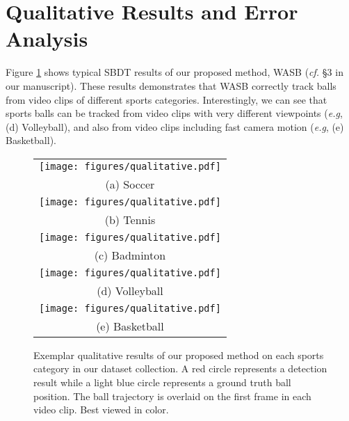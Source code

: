 \documentclass{bmvc2k}
\def\eg{\emph{e.g}\bmvaOneDot}
\begin{document}
\section{Qualitative Results and Error Analysis}
\label{appendix:result}
Figure \ref{fig:qualitative} shows typical SBDT results of our proposed method, WASB ({\it cf.} \S 3 in our manuscript).
These results demonstrates that WASB correctly track balls from video clips of different sports categories.
Interestingly, we can see that sports balls can be tracked from video clips with very different viewpoints (\eg, (d) Volleyball), and also from video clips including fast camera motion (\eg, (e) Basketball).
\begin{figure}[htbp]
\begin{tabular}{c}
\begin{minipage}[t]{1.0\hsize}
\centering
\texttt{[image: figures/qualitative.pdf]}
\end{minipage}
\\
(a) Soccer
\\
\begin{minipage}[t]{1.0\hsize}
\centering
\texttt{[image: figures/qualitative.pdf]}
\end{minipage}
\\
(b) Tennis
\\
\begin{minipage}[t]{1.0\hsize}
\centering
\texttt{[image: figures/qualitative.pdf]}
\end{minipage}
\\
(c) Badminton
\\
\begin{minipage}[t]{1.0\hsize}
\centering
\texttt{[image: figures/qualitative.pdf]}
\end{minipage}
\\
(d) Volleyball
\\
\begin{minipage}[t]{1.0\hsize}
\centering
\texttt{[image: figures/qualitative.pdf]}
\end{minipage}
\\
(e) Basketball
\end{tabular}
\caption{Exemplar qualitative results of our proposed method on each sports category in our dataset collection. A red circle represents a detection result while a light blue circle represents a ground truth ball position. The ball trajectory is overlaid on the first frame in each video clip. Best viewed in color.}
\label{fig:qualitative}
\end{figure}
\end{document}
